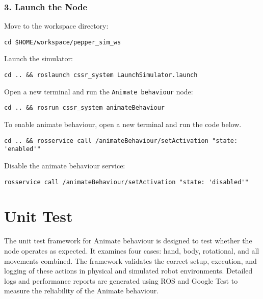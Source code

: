 \documentclass{CSSRforAfrica}
\begin{document}
\subsubsection*{3. Launch the Node}
Move to the workspace directory:\\
\begin{lstlisting}[style=linuxbashstyle]
cd $HOME/workspace/pepper_sim_ws
\end{lstlisting}
Launch the simulator:\\
\begin{lstlisting}[style=linuxbashstyle]
cd .. && roslaunch cssr_system LaunchSimulator.launch 
\end{lstlisting}
 Open a new terminal and run the \texttt{Animate behaviour} node:\\
\begin{lstlisting}[style=linuxbashstyle]
cd .. && rosrun cssr_system animateBehaviour
\end{lstlisting}
To enable animate behaviour, open a new terminal and run the code below.\\
\begin{lstlisting}[style=linuxbashstyle]
cd .. && rosservice call /animateBehaviour/setActivation "state: 'enabled'"
\end{lstlisting}
Disable the animate behaviour service:\\
\begin{lstlisting}[style=linuxbashstyle]
rosservice call /animateBehaviour/setActivation "state: 'disabled'"
\end{lstlisting}

\newpage
\section{Unit Test}
The unit test framework for Animate behaviour is designed to test whether the node operates as expected. It examines four cases: hand, body, rotational, and all movements combined. The framework validates the correct setup, execution, and logging of these actions in physical and simulated robot environments. Detailed logs and performance reports are generated using ROS and Google Test to measure the reliability of the Animate behaviour.
\end{document}

